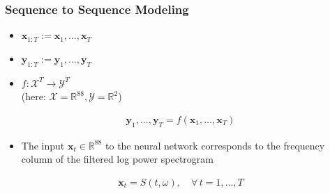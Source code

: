 \documentclass{beamer}
\begin{document}
\begin{frame}
\frametitle{Sequence to Sequence Modeling}
\begin{itemize}
\item {}  $\mathbf x_{1:T} := \mathbf x_1, \dots, \mathbf x_T$ 
\vspace{0.5em}
\item {} $\mathbf y_{1:T} := \mathbf y_1, \dots, \mathbf y_T$ 
\vspace{0.5em}
\item {} $f: \mathcal X^T \rightarrow \mathcal Y^T$ \\\vspace{0.5em}(here: $\mathcal X = \mathbb R^{88}, \mathcal Y = \mathbb R^2$)
\end{itemize}
\begin{align}
\mathbf y_1, \dots, \mathbf y_T  = f(\mathbf x_1, \dots, \mathbf x_T)
\end{align}
\begin{itemize}
\item The input  $\mathbf x_t \in \mathbb R^{88}$ to the neural network corresponds to the frequency column of the filtered log power spectrogram
\end{itemize}
\begin{align}
\mathbf x_t = S(t,\omega), \quad \forall\, t= 1,\dots,T
\end{align}
\end{frame}
\end{document}
